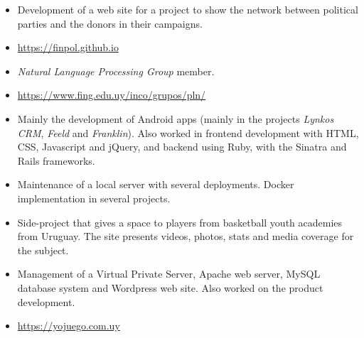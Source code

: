 \documentclass[10pt,a4paper,academicons]{altacv}
\begin{document}

\begin{itemize}
  \item Development of a web site for a project to show the network between political parties and the donors in their campaigns.
  \item \url{https://finpol.github.io}
\end{itemize}

\divider{}


\begin{itemize}
  \item \emph{Natural Language Processing Group} member.
  \item \url{https://www.fing.edu.uy/inco/grupos/pln/}
\end{itemize}

\divider{}


\begin{itemize}
  \item Mainly the development of Android apps (mainly in the projects \emph{Lynkos CRM}, \emph{Feeld} and \emph{Franklin}). Also worked in frontend development with HTML, CSS, Javascript and jQuery, and backend using Ruby, with the Sinatra and Rails frameworks.
  \item Maintenance of a local server with several deployments. Docker implementation in several projects.
\end{itemize}

\divider{}


\begin{itemize}
  \item Side-project that gives a space to players from basketball youth academies from Uruguay. The site presents videos, photos, stats and media coverage for the subject.
  \item Management of a Virtual Private Server, Apache web server, MySQL database system and Wordpress web site. Also worked on the product development.
  \item \url{https://yojuego.com.uy}
\end{itemize}
\end{document}
